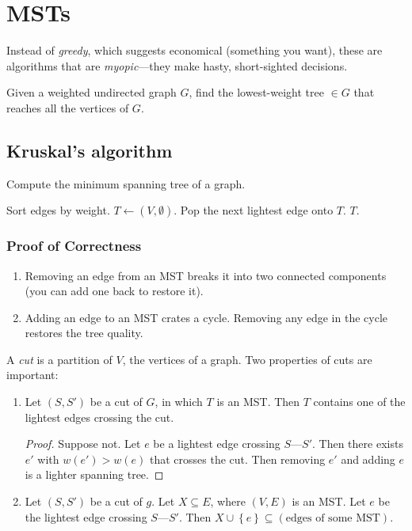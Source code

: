 \chapter{MSTs}
Instead of \emph{greedy}, which suggests  economical (something you want), these are algorithms that are \emph{myopic}---they make hasty, short-sighted decisions.

Given a weighted undirected graph \(G\), find the lowest-weight tree \(\in G\) that reaches all the vertices of \(G\).

\section{Kruskal's algorithm}
\begin{algorithm}
	\caption{Compute the minimum spanning tree of a graph.}
	\begin{algorithmic}
			\State Sort edges by weight.
			\State \(T \leftarrow (V, \emptyset)\).
				\State Pop the next lightest edge onto \(T\).
			\EndWhile
			\Return \(T\).
		\EndProcedure
	\end{algorithmic}
\end{algorithm}

\subsection{Proof of Correctness}
\begin{enumerate}
	\item Removing an edge from an MST breaks it into two connected components (you can add one back to restore it).
	\item Adding an edge to an MST crates a cycle. Removing any edge in the cycle restores the tree quality.
\end{enumerate}
A \emph{cut} is a partition of \(V\), the vertices of a graph. Two properties of cuts are important:
\begin{enumerate}
	\item Let \((S, S')\) be a cut of \(G\), in which \(T\) is an MST. Then \(T\) contains one of the lightest edges crossing the cut.
	\begin{proof}
		Suppose not. Let \(e\) be a lightest edge crossing \(S\)---\(S'\). Then there exists \(e'\) with \(w(e') > w(e)\) that crosses the cut. Then removing \(e'\) and adding \(e\) is a lighter spanning tree.
	\end{proof}
	\item Let \((S, S')\) be a cut of \(g\). Let \(X \subseteq E\), where \((V, E)\) is an MST. Let \(e\) be the lightest edge crossing \(S\text{---}S'\).
	Then \(X\cup\left\{e\right\} \subseteq \left(\text{edges of some MST}\right)\).
\end{enumerate}

